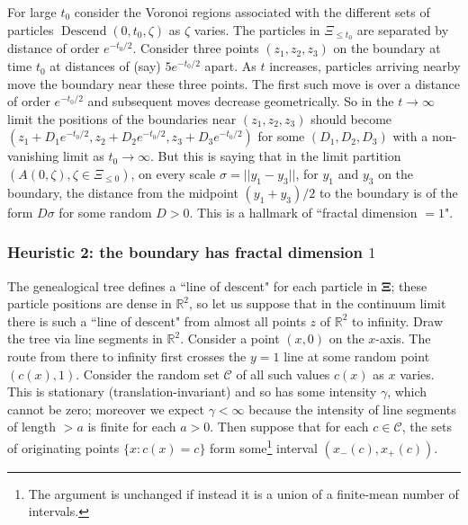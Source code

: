 \documentclass[12pt]{article}
\newcommand{\CC}{\mbox{${\mathcal C}$}}
\newcommand{\Reals}{{\mathbb{R}}}
\DeclareMathOperator{\descend}{Descend}
\begin{document}
For large $t_0$ consider the Voronoi regions associated with the different sets of particles $\descend(0,t_0,\zeta)$ as $\zeta$ varies.
The particles in $\Xi_{\le t_0}$ are separated by distance of order $e^{-t_0/2}$.
Consider three points $(z_1, z_2, z_3)$ on the boundary at time $t_0$ at distances of (say) $5e^{-t_0/2}$ apart. 
As $t$ increases, particles arriving nearby move the boundary near these three points. 
The first such move 
is over a distance of order $e^{-t_0/2}$ and subsequent moves decrease geometrically.  
So in the $t \to \infty$ limit  the positions of the boundaries near $(z_1, z_2, z_3)$ should become 
$(z_1+ D_1 e^{-t_0/2}, z_2 + D_2 e^{-t_0/2} , z_3 + D_3 e^{-t_0/2})$ 
for some  $(D_1, D_2, D_3)$ with a non-vanishing limit as $t_0 \to \infty$.
But this is saying that in the limit partition $(A(0,\zeta), \zeta \in \Xi_{\le 0})$,
on every scale $\sigma = || y_1 - y_3||$, 
for $y_1$ and $y_3$ on the boundary, the distance from the midpoint $(y_1 + y_3)/2$ to the boundary is of the form $D \sigma$ for 
some random $D>0$.
This is a hallmark of ``fractal dimension $=1$".




\subsubsection{Heuristic 2: the boundary has fractal dimension $1$}
\label{sec:notfractal}
The genealogical tree defines a ``line of descent" for each particle in $\bm{\Xi}$; these particle positions are dense in $\Reals^2$, so
let us suppose that in the continuum limit there is such a ``line of descent" from almost all points $z$ of $\Reals^2$ to infinity.  
Draw the tree via line segments in $\Reals^2$.
Consider a point $(x,0)$ on the $x$-axis.
The route from there to infinity first crosses the $y = 1$ line at some random point $(c(x), 1)$.
Consider the random set $\CC$ of all such values $c(x)$ as $x$ varies.  
This is stationary (translation-invariant)  and so has some intensity $\gamma$, which cannot be zero;
moreover we expect  $\gamma < \infty$ because  the intensity of line segments of length $> a$ is finite for each $a > 0$.
 Then suppose that for each $c \in \CC$, the sets of originating points 
 $\{x: c(x) = c\}$ form some\footnote{The argument is
  unchanged if instead it is a union of a finite-mean number of intervals.}  interval $(x_-(c), x_+(c))$.
  
\end{document}
